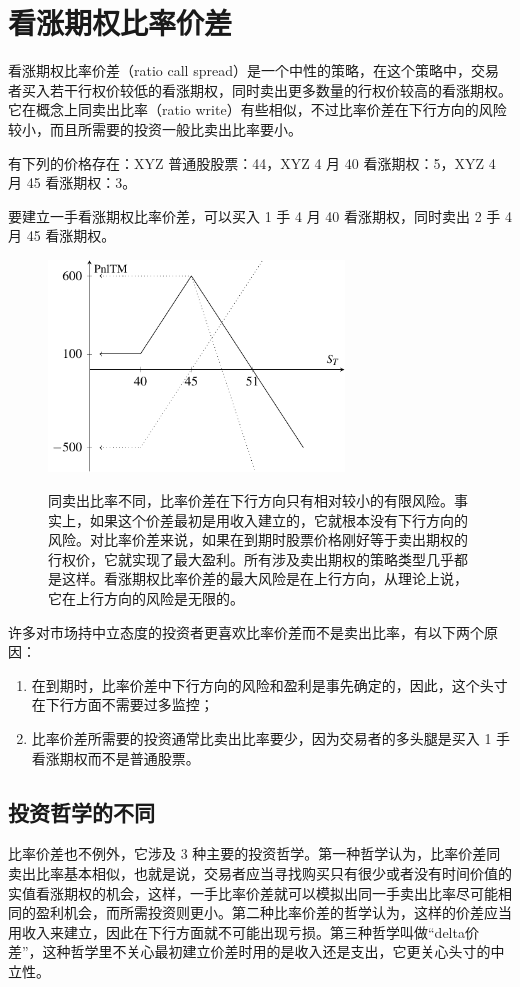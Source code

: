\chapter{看涨期权比率价差}
看涨期权比率价差（ratio call spread）是一个中性的策略，在这个策略中，交易者买入若干行权价较低的看涨期权，同时卖出更多数量的行权价较高的看涨期权。它在概念上同卖出比率（ratio write）有些相似，不过比率价差在下行方向的风险较小，而且所需要的投资一般比卖出比率要小。

有下列的价格存在：XYZ 普通股股票：44，XYZ 4 月 40 看涨期权：5，XYZ 4 月 45 看涨期权：3。

要建立一手看涨期权比率价差，可以买入 1 手 4 月 40 看涨期权，同时卖出 2 手 4 月 45 看涨期权。

\begin{figure}
    \centering
    \includegraphics[width=0.7\textwidth]{IMG/Ratio call spread 2to1.pdf}
    \label{fig:Ratio call spread}
    \caption{同卖出比率不同，比率价差在下行方向只有相对较小的有限风险。事实上，如果这个价差最初是用收入建立的，它就根本没有下行方向的风险。对比率价差来说，如果在到期时股票价格刚好等于卖出期权的行权价，它就实现了最大盈利。所有涉及卖出期权的策略类型几乎都是这样。看涨期权比率价差的最大风险是在上行方向，从理论上说，它在上行方向的风险是无限的。}
\end{figure}

许多对市场持中立态度的投资者更喜欢比率价差而不是卖出比率，有以下两个原因：
\begin{enumerate}
    \item 在到期时，比率价差中下行方向的风险和盈利是事先确定的，因此，这个头寸在下行方面不需要过多监控；
    \item 比率价差所需要的投资通常比卖出比率要少，因为交易者的多头腿是买入 1 手看涨期权而不是普通股票。
\end{enumerate}
\section{投资哲学的不同}
比率价差也不例外，它涉及 3 种主要的投资哲学。第一种哲学认为，比率价差同卖出比率基本相似，也就是说，交易者应当寻找购买只有很少或者没有时间价值的实值看涨期权的机会，这样，一手比率价差就可以模拟出同一手卖出比率尽可能相同的盈利机会，而所需投资则更小。第二种比率价差的哲学认为，这样的价差应当用收入来建立，因此在下行方面就不可能出现亏损。第三种哲学叫做“delta价差”，这种哲学里不关心最初建立价差时用的是收入还是支出，它更关心头寸的中立性。
